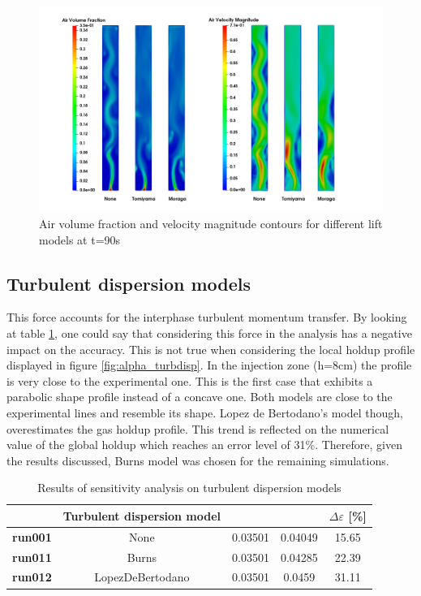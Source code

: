 \documentclass[11pt,a4paper]{article}
\newcommand{\thead}[2][.95in]{%
  \vbox{\hsize#1\baselineskip11pt\centering\vspace*{3pt}#2\par}}
\begin{document}
\begin{figure}[!ht]
	\centering
	\includegraphics[width=\textwidth]{Images/lift_models.png}
	\caption{Air volume fraction and velocity magnitude contours for different lift models at t=90s}
	\label{fig:lift_models}
\end{figure}


\subsection{Turbulent dispersion models}
\label{sub:turbulent_dispersion_models}

This force accounts for the interphase turbulent momentum transfer. By looking at table \ref{table:turbulent_dispersion_models}, one could say that considering this force in the analysis has a negative impact on the accuracy. This is not true when considering the local holdup profile displayed in figure \ref{fig:alpha_turbdisp}. In the injection zone (h=8cm) the profile is very close to the experimental one. This is the first case that exhibits a parabolic shape profile instead of a concave one. Both models are close to the experimental lines and resemble its shape. Lopez de Bertodano's model though, overestimates the gas holdup profile. This trend is reflected on the numerical value of the global holdup which reaches an error level of 31\%. Therefore, given the results discussed, Burns model was chosen for the remaining simulations.

\begin{table}[H]
    \centering 
    \begin{tabular}{|p{8em} c c c c|}
    \hline
    \rowcolor{bluePoli!40}
    & \textbf{Turbulent dispersion model} & \thead{Experimental holdup [-]} & \thead{Numerical holdup [-]} & $\Delta \varepsilon$ [\%] \T\B \\
    \hline \hline
    \textbf{run001} & None & 0.03501 & 0.04049 & 15.65\T\B \\
    \textbf{run011} & Burns & 0.03501 & 0.04285 & 22.39\T\B \\
    \textbf{run012} & LopezDeBertodano & 0.03501 & 0.0459 & 31.11\T\B \\
    \hline
    \end{tabular}
    \\[10pt]
    \caption{Results of sensitivity analysis on turbulent dispersion models}
    \label{table:turbulent_dispersion_models}
\end{table}
\end{document}
